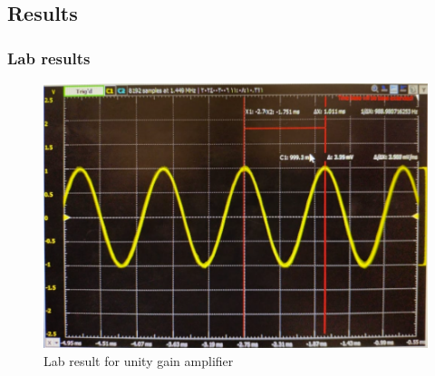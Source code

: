 \documentclass[a4paper, 12pt, english]{article}
\begin{document}
\subsection{Results}
\subsubsection{Lab results}
\begin{figure}[h]
    \centering
    \includegraphics[width=\linewidth]{images/unityLab.png}
    \caption{Lab result for unity gain amplifier}
    \label{fig:Lab result for unity gain amplifier}
\end{figure}
\end{document}
